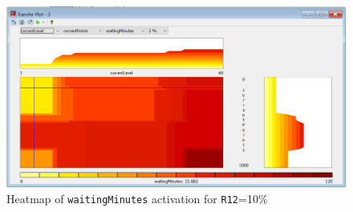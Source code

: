 \begin{figure}[H]
\centering
\includegraphics[width=\textwidth]{img/profile1_r12-10}
\caption{Heatmap of \texttt{waitingMinutes} activation for \texttt{R12}=10\%}
\label{fig:prof1_3d10} 
\end{figure}





